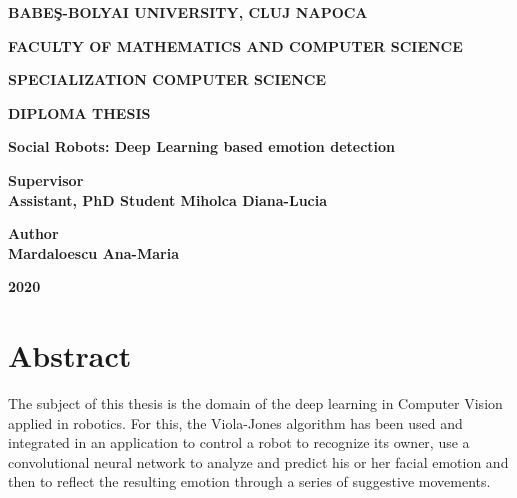 \documentclass[runningheads,a4paper,12pt]{report}
\begin{document}
\begin{titlepage}
\sloppy
\begin{center}
\Large \textbf{BABE\c S-BOLYAI UNIVERSITY, CLUJ NAPOCA}

\Large \textbf{FACULTY OF MATHEMATICS AND COMPUTER SCIENCE}

\Large \textbf{SPECIALIZATION COMPUTER SCIENCE}

\vspace{4cm}

\LARGE \textbf{DIPLOMA THESIS}

\vspace{0.3cm}

\LARGE \textbf {Social Robots: Deep Learning based emotion detection}

\end{center}

\vspace{3cm}

\begin{flushleft}
\LARGE{\textbf{Supervisor}}\\
\LARGE{\textbf{Assistant, PhD Student Miholca Diana-Lucia}}
\end{flushleft}

\vspace{0.5cm}

\begin{flushright}
\LARGE{\textbf{Author}}\\
\LARGE{\textbf{Mardaloescu Ana-Maria}}
\end{flushright}

\vspace{3cm}

\begin{center}
\LARGE{\textbf{2020}}
\end{center}

\newpage

\end{titlepage}


\tableofcontents

\newpage



\chapter*{Abstract}
The subject of this thesis is the domain of the deep learning in Computer Vision applied in robotics. For this, the Viola-Jones algorithm has been used and integrated in an application to control a robot to recognize its owner, use a convolutional neural network to analyze and predict his or her facial emotion and then to reflect the resulting emotion through a series of suggestive movements. 
\end{document}
